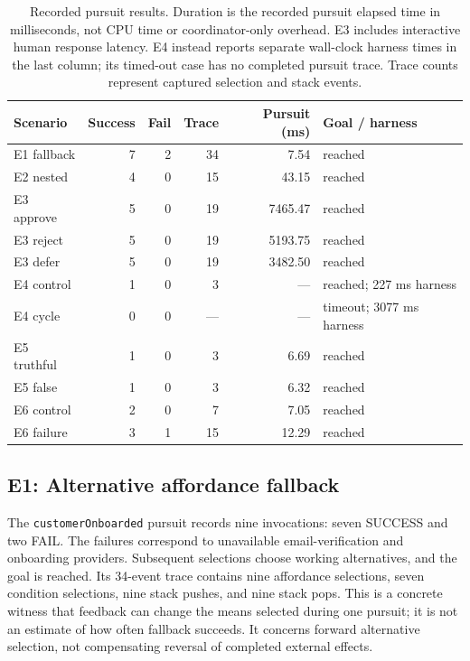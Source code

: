 \documentclass[11pt]{article}
\begin{document}
\begin{table}[ht]
\centering\small
\caption{Recorded pursuit results. Duration is the recorded pursuit elapsed time in milliseconds, not CPU time or coordinator-only overhead. E3 includes interactive human response latency. E4 instead reports separate wall-clock harness times in the last column; its timed-out case has no completed pursuit trace. Trace counts represent captured selection and stack events.}
\label{tab:results}
\begin{tabular}{@{}lrrrrl@{}}
\toprule
Scenario & Success & Fail & Trace & Pursuit (ms) & Goal / harness \\
\midrule
E1 fallback & 7 & 2 & 34 & 7.54 & reached \\
E2 nested & 4 & 0 & 15 & 43.15 & reached \\
E3 approve & 5 & 0 & 19 & 7465.47 & reached \\
E3 reject & 5 & 0 & 19 & 5193.75 & reached \\
E3 defer & 5 & 0 & 19 & 3482.50 & reached \\
E4 control & 1 & 0 & 3 & --- & reached; 227 ms harness \\
E4 cycle & 0 & 0 & --- & --- & timeout; 3077 ms harness \\
E5 truthful & 1 & 0 & 3 & 6.69 & reached \\
E5 false & 1 & 0 & 3 & 6.32 & reached \\
E6 control & 2 & 0 & 7 & 7.05 & reached \\
E6 failure & 3 & 1 & 15 & 12.29 & reached \\
\bottomrule
\end{tabular}
\end{table}

\subsection{E1: Alternative affordance fallback}
The \texttt{customerOnboarded} pursuit records nine invocations: seven SUCCESS and two FAIL. The failures correspond to unavailable email-verification and onboarding providers. Subsequent selections choose working alternatives, and the goal is reached. Its 34-event trace contains nine affordance selections, seven condition selections, nine stack pushes, and nine stack pops. This is a concrete witness that feedback can change the means selected during one pursuit; it is not an estimate of how often fallback succeeds. It concerns forward alternative selection, not compensating reversal of completed external effects.
\end{document}
